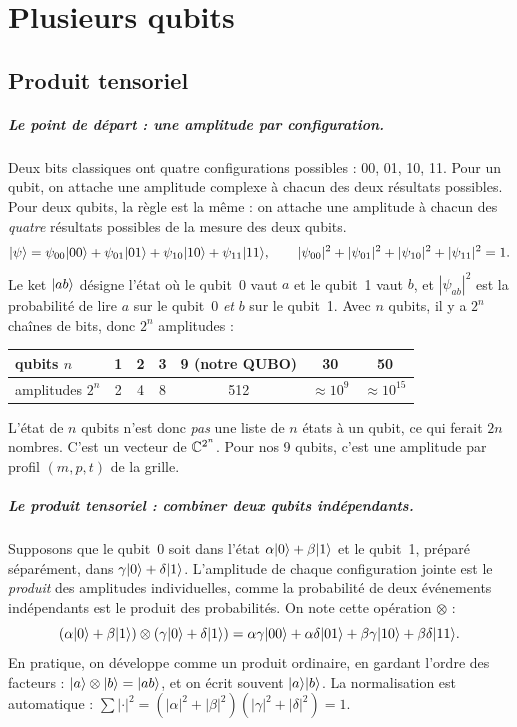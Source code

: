 \chapter{Plusieurs qubits}\label{ch:multi}

\section{Produit tensoriel}
\paragraph{Le point de départ : une amplitude par configuration.} Deux bits classiques ont quatre configurations possibles : 00, 01, 10, 11. Pour un qubit, on attache une amplitude complexe à chacun des deux résultats possibles. Pour deux qubits, la règle est la même : on attache une amplitude à chacun des \emph{quatre} résultats possibles de la mesure des deux qubits.
\[
\lvert \psi\rangle=\psi_{00}\lvert 00\rangle+\psi_{01}\lvert 01\rangle+\psi_{10}\lvert 10\rangle+\psi_{11}\lvert 11\rangle,\qquad |\psi_{00}|^2+|\psi_{01}|^2+|\psi_{10}|^2+|\psi_{11}|^2=1 .
\]
Le ket $\lvert ab\rangle$ désigne l'état où le qubit~0 vaut $a$ et le qubit~1 vaut $b$, et $|\psi_{ab}|^2$ est la probabilité de lire $a$ sur le qubit~0 \emph{et} $b$ sur le qubit~1. Avec $n$ qubits, il y a $2^n$ chaînes de bits, donc $2^n$ amplitudes :
\begin{center}
\begin{tabular}{lcccccc}
\toprule
qubits $n$ & 1 & 2 & 3 & 9 (notre QUBO) & 30 & 50\\
\midrule
amplitudes $2^n$ & 2 & 4 & 8 & 512 & $\approx10^9$ & $\approx10^{15}$\\
\bottomrule
\end{tabular}
\end{center}
L'état de $n$ qubits n'est donc \emph{pas} une liste de $n$ états à un qubit, ce qui ferait $2n$ nombres. C'est un vecteur de $\mathbb{C}^{2^n}$. Pour nos 9 qubits, c'est une amplitude par profil $(m,p,t)$ de la grille.

\paragraph{Le produit tensoriel : combiner deux qubits indépendants.} Supposons que le qubit~0 soit dans l'état $\alpha\lvert 0\rangle+\beta\lvert 1\rangle$ et le qubit~1, préparé séparément, dans $\gamma\lvert 0\rangle+\delta\lvert 1\rangle$. L'amplitude de chaque configuration jointe est le \emph{produit} des amplitudes individuelles, comme la probabilité de deux événements indépendants est le produit des probabilités. On note cette opération $\otimes$ :
\[
(\alpha\lvert 0\rangle+\beta\lvert 1\rangle)\otimes(\gamma\lvert 0\rangle+\delta\lvert 1\rangle)=\alpha\gamma\lvert 00\rangle+\alpha\delta\lvert 01\rangle+\beta\gamma\lvert 10\rangle+\beta\delta\lvert 11\rangle.
\]
En pratique, on développe comme un produit ordinaire, en gardant l'ordre des facteurs : $\lvert a\rangle\otimes\lvert b\rangle=\lvert ab\rangle$, et on écrit souvent $\lvert a\rangle\lvert b\rangle$. La normalisation est automatique : $\sum|\cdot|^2=(|\alpha|^2+|\beta|^2)(|\gamma|^2+|\delta|^2)=1$.

